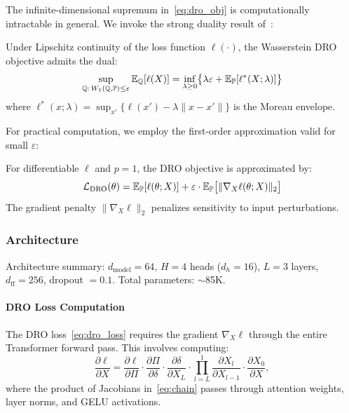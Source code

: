 The infinite-dimensional supremum in~\eqref{eq:dro_obj} is computationally intractable in general. We invoke the strong duality result of~\citet{blanchet2019quantifying}:

\begin{proposition}
\label{prop:dual}
Under Lipschitz continuity of the loss function $\ell(\cdot)$, the Wasserstein DRO objective admits the dual:
\begin{equation}
    \sup_{\mathbb{Q}:\, W_1(\mathbb{Q},\mathbb{P}) \leq \varepsilon} \mathbb{E}_{\mathbb{Q}}[\ell(X)] = \inf_{\lambda \geq 0} \bigl\{\lambda\varepsilon + \mathbb{E}_{\mathbb{P}}[\ell^*(X; \lambda)]\bigr\}
\end{equation}
where $\ell^*(x; \lambda) = \sup_{x'}\{\ell(x') - \lambda \|x - x'\|\}$ is the Moreau envelope.
\end{proposition}

For practical computation, we employ the first-order approximation valid for small $\varepsilon$:

\begin{corollary}
\label{cor:grad_penalty}
For differentiable $\ell$ and $p=1$, the DRO objective is approximated by:
\begin{equation}
    \mathcal{L}_{\mathrm{DRO}}(\theta) = \mathbb{E}_{\mathbb{P}}[\ell(\theta; X)] + \varepsilon \cdot \mathbb{E}_{\mathbb{P}}\bigl[\|\nabla_X \ell(\theta; X)\|_2\bigr]
    \label{eq:dro_loss}
\end{equation}
The gradient penalty $\|\nabla_X \ell\|_2$ penalizes sensitivity to input perturbations.
\end{corollary}

\subsubsection{Architecture}

Architecture summary: $d_{\mathrm{model}} = 64$, $H = 4$ heads ($d_h = 16$), $L = 3$ layers, $d_{\mathrm{ff}} = 256$, dropout $= 0.1$.  Total parameters: $\sim$85K.

\paragraph{DRO Loss Computation}

The DRO loss~\eqref{eq:dro_loss} requires the gradient $\nabla_X \ell$ through the entire Transformer forward pass.  This involves computing:
\begin{equation}
    \frac{\partial \ell}{\partial X} = \frac{\partial \ell}{\partial \Pi} \cdot \frac{\partial \Pi}{\partial \delta} \cdot \frac{\partial \delta}{\partial X_L} \cdot \prod_{l=L}^{1} \frac{\partial X_l}{\partial X_{l-1}} \cdot \frac{\partial X_0}{\partial X},
    \label{eq:chain}
\end{equation}
where the product of Jacobians in~\eqref{eq:chain} passes through attention weights, layer norms, and GELU activations.

